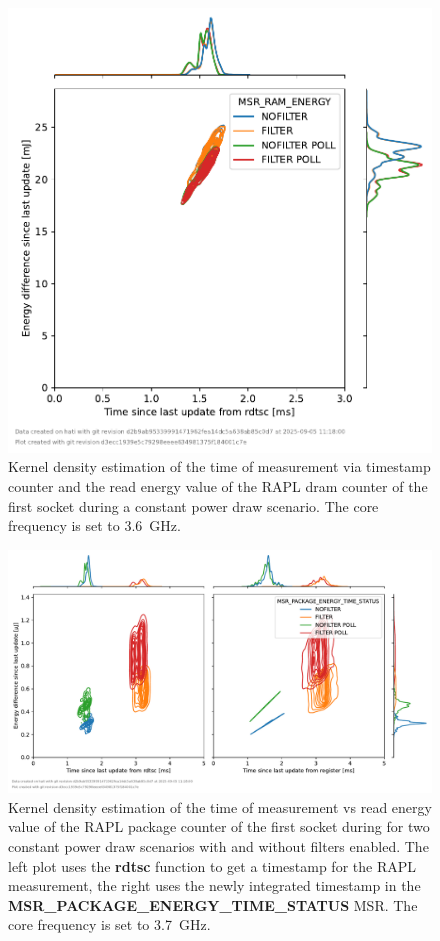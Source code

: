 \begin{figure}[]
    \centering
    \includegraphics[width=0.54\columnwidth]{fig/rapl-update-intervals/MSR_RAM_ENERGY_3600000.pdf}
    \caption{Kernel density estimation of the time of measurement via timestamp counter and the read energy value of the RAPL dram counter of the first socket during a constant power draw scenario.
    The core frequency is set to \SI{3.6}{\GHz}.}
\end{figure}

\clearpage
\begin{figure}[]
    \centering
    \includegraphics[width=\columnwidth]{fig/rapl-update-intervals/MSR_PACKAGE_ENERGY_TIME_STATUS_3700000.pdf}
    \caption{Kernel density estimation of the time of measurement vs read energy value of the RAPL package counter of the first socket during for two constant power draw scenarios with and without filters enabled.
    The left plot uses the \textbf{rdtsc} function to get a timestamp for the RAPL measurement, the right uses the newly integrated timestamp in the \textbf{MSR\_PACKAGE\_ENERGY\_TIME\_STATUS} MSR.
    The core frequency is set to \SI{3.7}{\GHz}.}
\end{figure}

